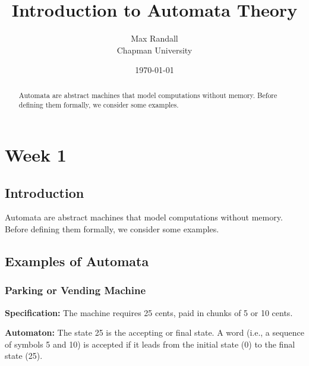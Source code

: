 \documentclass{article}
\title{Introduction to Automata Theory}
\author{Max Randall \\ Chapman University}
\date{\today}
\begin{document}
\maketitle

\begin{abstract}
Automata are abstract machines that model computations without memory. Before defining them formally, we consider some examples.
\end{abstract}

\tableofcontents

\section{Week 1}

\subsection{Introduction}
Automata are abstract machines that model computations without memory. Before defining them formally, we consider some examples.

\newpage

\subsection{Examples of Automata}

\subsubsection{Parking or Vending Machine}
\textbf{Specification:} The machine requires 25 cents, paid in chunks of 5 or 10 cents.

\textbf{Automaton:} The state 25 is the accepting or final state. A word (i.e., a sequence of symbols 5 and 10) is accepted if it leads from the initial state (0) to the final state (25).

\begin{center}
\end{center}
\end{document}
